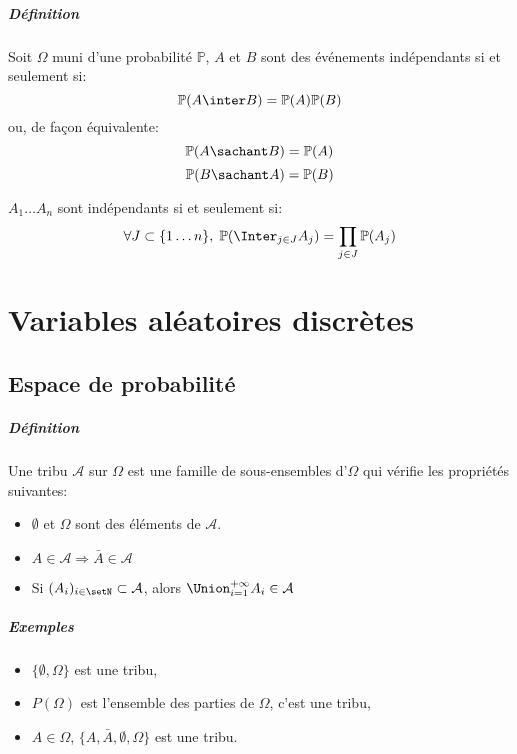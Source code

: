 \documentclass[a4paper,10pt,french,openany]{memoir}
\newcommand{\Proba}{\mathbb{P}}
\newcommand{\tribu}[1]{\mathcal{#1}}
\newcommand{\implique}{\Rightarrow}
\begin{document}
\paragraph{Définition}
Soit $\Omega$ muni d'une probabilité $\Proba$, $A$ et $B$ sont des événements indépendants si et seulement si:
\[\Proba(A \inter B) = \Proba(A) \Proba(B)\]
ou, de façon équivalente:
\[\Proba(A \sachant B) = \Proba(A)\]
\[\Proba(B \sachant A) = \Proba(B)\]

$A_1 \dots A_n$ sont indépendants si et seulement si:
\[\forall J \subset \lbrace 1 \dots n \rbrace, \; \Proba(\Inter_{j \in J} A_j) = \prod_{j \in J} \Proba(A_j)\]

\chapter{Variables aléatoires discrètes}

\section{Espace de probabilité}

\paragraph{Définition}
Une tribu $\tribu{A}$ sur $\Omega$ est une famille de sous-ensembles d'$\Omega$ qui vérifie les propriétés suivantes:

\begin{itemize}
 \item $\emptyset$ et $\Omega$ sont des éléments de $\tribu A$.
 \item $A \in \tribu A \implique \bar A \in \tribu A $
 \item Si $(A_i)_{i \in \setN} \subset \tribu A$, alors $\Union_{i=1}^{+\infty} A_i \in \tribu A$
\end{itemize}

\paragraph{Exemples}
\begin{itemize}
 \item $\{\emptyset, \Omega\}$ est une tribu,
 \item $P(\Omega)$ est l'ensemble des parties de $\Omega$, c'est une tribu,
 \item $A \in \Omega$, $\{ A, \bar A, \emptyset, \Omega \}$ est une tribu.
\end{itemize}
\end{document}
